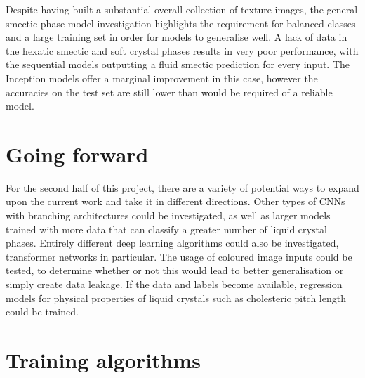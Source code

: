 \documentclass[12pt]{article}
\begin{document}
Despite having built a substantial overall collection of texture images, the general smectic phase model investigation highlights the requirement for balanced classes and a large training set in order for models to generalise well. A lack of data in the hexatic smectic and soft crystal phases results in very poor performance, with the sequential models outputting a fluid smectic prediction for every input. The Inception models offer a marginal improvement in this case, however the accuracies on the test set are still lower than would be required of a reliable model.
\section{Going forward}
For the second half of this project, there are a variety of potential ways to expand upon the current work and take it in different directions. Other types of CNNs with branching architectures could be investigated, as well as larger models trained with more data that can classify a greater number of liquid crystal phases. Entirely different deep learning algorithms could also be investigated, transformer networks in particular. The usage of coloured image inputs could be tested, to determine whether or not this would lead to better generalisation or simply create data leakage. If the data and labels become available, regression models for physical properties of liquid crystals such as cholesteric pitch length could be trained.



\appendix
\appendixpage
\section{Training algorithms}
\end{document}
